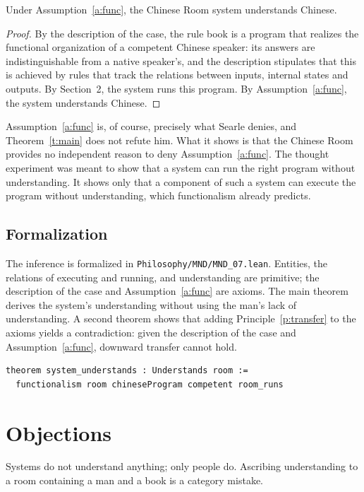 \documentclass{situationist-preprint}
\begin{document}
\begin{theorem}\label{t:main}
Under Assumption~\ref{a:func}, the Chinese Room system understands Chinese.
\end{theorem}

\begin{proof}
By the description of the case, the rule book is a program that realizes the functional organization of a competent Chinese speaker: its answers are indistinguishable from a native speaker's, and the description stipulates that this is achieved by rules that track the relations between inputs, internal states and outputs. By Section~2, the system runs this program. By Assumption~\ref{a:func}, the system understands Chinese.
\end{proof}

Assumption~\ref{a:func} is, of course, precisely what Searle denies, and Theorem~\ref{t:main} does not refute him. What it shows is that the Chinese Room provides no independent reason to deny Assumption~\ref{a:func}. The thought experiment was meant to show that a system can run the right program without understanding. It shows only that a component of such a system can execute the program without understanding, which functionalism already predicts.

\subsection{Formalization}

The inference is formalized in \nolinkurl{Philosophy/MND/MND_07.lean}. Entities, the relations of executing and running, and understanding are primitive; the description of the case and Assumption~\ref{a:func} are axioms. The main theorem derives the system's understanding without using the man's lack of understanding. A second theorem shows that adding Principle~\ref{p:transfer} to the axioms yields a contradiction: given the description of the case and Assumption~\ref{a:func}, downward transfer cannot hold.

\begin{lstlisting}
theorem system_understands : Understands room :=
  functionalism room chineseProgram competent room_runs
\end{lstlisting}

\section{Objections}

\begin{objection}
Systems do not understand anything; only people do. Ascribing understanding to a room containing a man and a book is a category mistake.
\end{objection}
\end{document}
